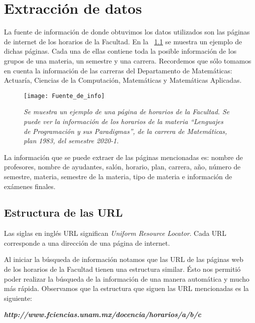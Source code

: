 \chapter{Extracción de datos}

La fuente de información de donde obtuvimos los datos utilizados son las páginas de internet de los horarios de la Facultad. En la \figurename{~\ref{pagFC}} se muestra un ejemplo de dichas páginas. Cada una de ellas contiene toda la posible información de los grupos de una materia, un semestre y una carrera. Recordemos que sólo tomamos en cuenta la información de las carreras del Departamento de Matemáticas: Actuaría, Ciencias de la Computación, Matemáticas y Matemáticas Aplicadas.

\begin{figure}[H]
\centering
\texttt{[image: Fuente\_de\_info]} %
\caption[\textit{Página de horarios de la Facultad}]{\textit{Se muestra un ejemplo de una página de horarios de la Facultad. Se puede ver la información de los horarios de la materia ``Lenguajes de Programación y sus Paradigmas'', de la carrera de Matemáticas, plan 1983, del semestre 2020-1.}}\label{pagFC}
\end{figure}

La información que se puede extraer de las páginas mencionadas es: nombre de profesores, nombre de ayudantes, salón, horario, plan, carrera, año, número de semestre, materia, semestre de la materia, tipo de materia e información de exámenes finales.


\section{Estructura de las URL} \label{Sec_ED_estructura_URL}

Las siglas en inglés URL significan \textit{Uniform Resource Locator}. Cada URL corresponde a una dirección de una página de internet. %

Al iniciar la búsqueda de información notamos que las URL de las páginas web de los horarios de la Facultad tienen una estructura similar. Ésto nos permitió poder realizar la búsqueda de la información de una manera automática y mucho más rápida. Observamos que la estructura que siguen las URL mencionadas es la siguiente:
  
  \begin{center}
\textit{\textbf{http://www.fciencias.unam.mx/docencia/horarios/a/b/c}}
\end{center}

